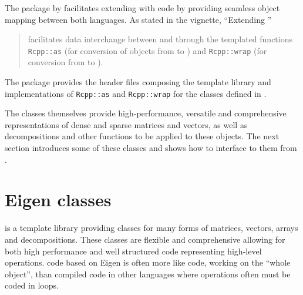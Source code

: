 \documentclass[shortnames,article]{jss}
\begin{document}
The  package by \citet{JSS:Rcpp,CRAN:Rcpp} facilitates extending
 with  code by providing seamless object mapping
between both languages.
%
As stated in the  \citep{CRAN:Rcpp} vignette, ``Extending ''
\begin{quote}
   facilitates data interchange between  and
   through the templated functions \texttt{Rcpp::as} (for
  conversion of objects from  to ) and
  \texttt{Rcpp::wrap} (for conversion from  to ).
\end{quote}
The  package provides the header files composing the
  template library and implementations of
\texttt{Rcpp::as} and \texttt{Rcpp::wrap} for the 
classes defined in .

The  classes themselves provide high-performance,
versatile and comprehensive representations of dense and sparse
matrices and vectors, as well as decompositions and other functions
to be applied to these objects.  The next section introduces some
of these classes and shows how to interface to them from .

\section{Eigen classes}
\label{sec:eclasses}

 \citep*{Eigen:Web} is a  template
library providing classes for many forms of matrices, vectors, arrays
and decompositions.  These classes are flexible and comprehensive
allowing for both high performance and well structured code
representing high-level operations.  code based on Eigen
is often more like  code, working on the ``whole object'',
than compiled code in other languages where operations often must be
coded in loops.
\end{document}
